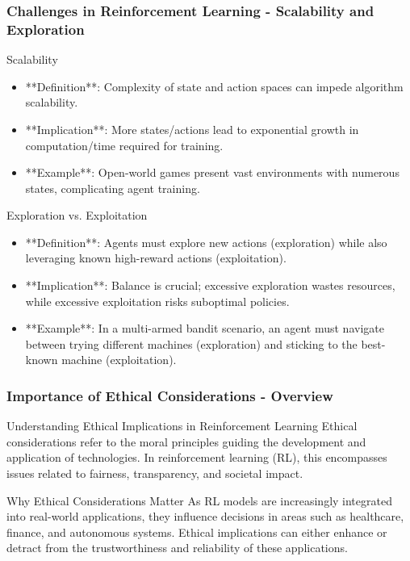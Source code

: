 \documentclass[aspectratio=169]{beamer}
\begin{document}
\begin{frame}[fragile]
    \frametitle{Challenges in Reinforcement Learning - Scalability and Exploration}
    \begin{block}{Scalability}
        \begin{itemize}
            \item **Definition**: Complexity of state and action spaces can impede algorithm scalability.
            \item **Implication**: More states/actions lead to exponential growth in computation/time required for training.
            \item **Example**: Open-world games present vast environments with numerous states, complicating agent training.
        \end{itemize}
    \end{block}
    
    \begin{block}{Exploration vs. Exploitation}
        \begin{itemize}
            \item **Definition**: Agents must explore new actions (exploration) while also leveraging known high-reward actions (exploitation).
            \item **Implication**: Balance is crucial; excessive exploration wastes resources, while excessive exploitation risks suboptimal policies.
            \item **Example**: In a multi-armed bandit scenario, an agent must navigate between trying different machines (exploration) and sticking to the best-known machine (exploitation).
        \end{itemize}
    \end{block}
\end{frame}

\begin{frame}[fragile]
    \frametitle{Importance of Ethical Considerations - Overview}
    \begin{block}{Understanding Ethical Implications in Reinforcement Learning}
        Ethical considerations refer to the moral principles guiding the development and application of technologies. In reinforcement learning (RL), this encompasses issues related to fairness, transparency, and societal impact.
    \end{block}

    \begin{block}{Why Ethical Considerations Matter}
        As RL models are increasingly integrated into real-world applications, they influence decisions in areas such as healthcare, finance, and autonomous systems. Ethical implications can either enhance or detract from the trustworthiness and reliability of these applications.
    \end{block}
\end{frame}
\end{document}
